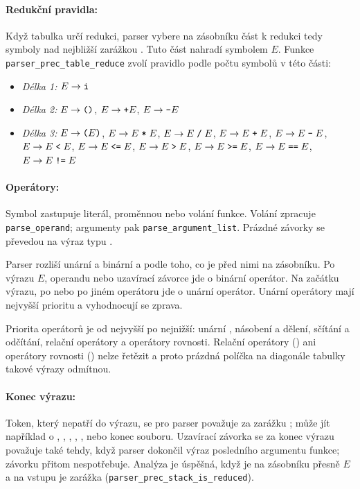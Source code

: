 \paragraph{Redukční pravidla:}
Když tabulka určí redukci, parser vybere na zásobníku část k redukci tedy symboly nad nejbližší zarážkou \tm{<}. Tuto část nahradí symbolem $E$. Funkce \texttt{parser\_prec\_table\_reduce} zvolí pravidlo podle počtu symbolů v této části:
\begin{itemize}
    \item \textit{Délka 1:} $E \to \texttt{i}$
    \item \textit{Délka 2:} $E \to \texttt{(}\texttt{)}$, \quad $E \to \texttt{+}E$, \quad $E \to \texttt{-}E$
    \item \textit{Délka 3:} $E \to \texttt{(}E\texttt{)}$, \quad $E \to E\;\texttt{*} \; E$, \quad $E \to E\;\texttt{/} \; E$, \quad $E \to E\;\texttt{+} \; E$, \quad $E \to E\;\texttt{-} \; E$, \\
          $E \to E\;\texttt{<} \; E$, \quad $E \to E\;\texttt{<=} \; E$, \quad $E \to E\;\texttt{>} \; E$, \quad $E \to E\;\texttt{>=} \; E$, \quad $E \to E\;\texttt{==} \; E$, \quad $E \to E\;\texttt{!=} \; E$
\end{itemize}

\paragraph{Operátory:}
Symbol  zastupuje literál, proměnnou nebo volání funkce. Volání zpracuje \texttt{parse\_operand}; argumenty pak \texttt{parse\_argument\_list}. Prázdné závorky \tm{()} se převedou na výraz typu .

Parser rozliší unární a binární \tm{+} a \tm{-} podle toho, co je před nimi na zásobníku. Po výrazu $E$, operandu  nebo uzavírací závorce \tm{)} jde o binární operátor. Na začátku výrazu, po \tm{(} nebo po jiném operátoru jde o unární operátor. Unární operátory mají nejvyšší prioritu a vyhodnocují se zprava.

Priorita operátorů je od nejvyšší po nejnižší: unární \tm{+,-}, násobení a dělení, sčítání a odčítání, relační operátory a operátory rovnosti. Relační operátory (\tm{<,<=,>,>=}) ani operátory rovnosti (\tm{==,!=}) nelze řetězit a proto prázdná políčka na diagonále tabulky takové výrazy odmítnou.

\paragraph{Konec výrazu:}
Token, který nepatří do výrazu, se pro parser považuje za zarážku \tm{\$}; může jít například o , \tm{;}, \tm{,}, , ,  nebo konec souboru. Uzavírací závorka \tm{)} se za konec výrazu považuje také tehdy, když parser dokončil výraz posledního argumentu funkce; závorku přitom nespotřebuje. Analýza je úspěšná, když je na zásobníku přesně \tm{\$} $E$ a na vstupu je zarážka \tm{\$} (\texttt{parser\_prec\_stack\_is\_reduced}).
